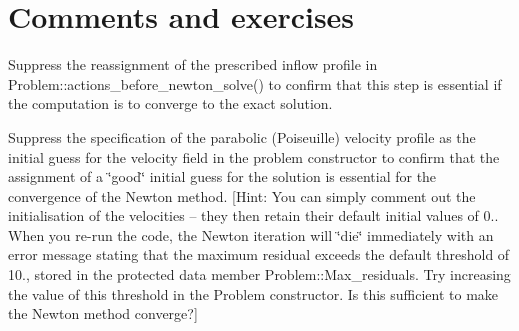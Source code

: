 



 

\hypertarget{index_comments}{}\section{Comments and exercises}\label{index_comments}

\begin{DoxyEnumerate}
\item Suppress the reassignment of the prescribed inflow profile in {\ttfamily Problem\+::actions\+\_\+before\+\_\+newton\+\_\+solve()} to confirm that this step is essential if the computation is to converge to the exact solution.
\item Suppress the specification of the parabolic (Poiseuille) velocity profile as the initial guess for the velocity field in the problem constructor to confirm that the assignment of a \char`\"{}good\char`\"{} initial guess for the solution is essential for the convergence of the Newton method. \mbox{[}Hint\+: You can simply comment out the initialisation of the velocities -- they then retain their default initial values of 0.. When you re-\/run the code, the Newton iteration will \char`\"{}die\char`\"{} immediately with an error message stating that the maximum residual exceeds the default threshold of 10., stored in the protected data member {\ttfamily Problem\+::\+Max\+\_\+residuals}. Try increasing the value of this threshold in the Problem constructor. Is this sufficient to make the Newton method converge?\mbox{]}
\end{DoxyEnumerate}



